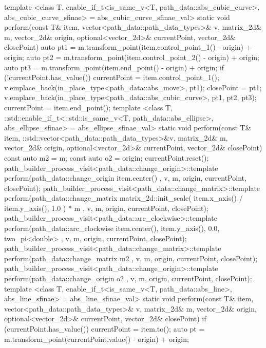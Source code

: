 \begin{codeblock}
{{      template <class T, enable_if_t<is_same_v<T, path_data::abs_cubic_curve>, abs_cubic_curve_sfinae> = abs_cubic_curve_sfinae_val>
      static void perform(const T& item, vector<path_data::path_data_types>& v, matrix_2d& m, vector_2d& origin, optional<vector_2d>& currentPoint, vector_2d& closePoint) {
        auto pt1 = m.transform_point(item.control_point_1() - origin) + origin;
        auto pt2 = m.transform_point(item.control_point_2() - origin) + origin;
        auto pt3 = m.transform_point(item.end_point() - origin) + origin;
        if (!currentPoint.has_value()) {
          currentPoint = item.control_point_1();
          v.emplace_back(in_place_type<path_data::abs_move>, pt1);
          closePoint = pt1;
        }
        v.emplace_back(in_place_type<path_data::abs_cubic_curve>, pt1,
          pt2, pt3);
        currentPoint = item.end_point();
      }
      template <class T, ::std::enable_if_t<::std::is_same_v<T, path_data::abs_ellipse>, abs_ellipse_sfinae> = abs_ellipse_sfinae_val>
      static void perform(const T& item, ::std::vector<path_data::path_data_types>&v, matrix_2d& m, vector_2d& origin, optional<vector_2d>& currentPoint, vector_2d& closePoint) {
        const auto m2 = m;
        const auto o2 = origin;
        currentPoint.reset();
        path_builder_process_visit<path_data::change_origin>::template perform(path_data::change_origin{ item.center() }, v, m, origin, currentPoint, closePoint);
        path_builder_process_visit<path_data::change_matrix>::template perform(path_data::change_matrix{ matrix_2d::init_scale({ item.x_axis() / item.y_axis(), 1.0 }) * m }, v, m, origin, currentPoint, closePoint);
        path_builder_process_visit<path_data::arc_clockwise>::template perform(path_data::arc_clockwise{ item.center(), item.y_axis(), 0.0, two_pi<double> }, v, m, origin, currentPoint, closePoint);
        path_builder_process_visit<path_data::change_matrix>::template perform(path_data::change_matrix{ m2 }, v, m, origin, currentPoint, closePoint);
        path_builder_process_visit<path_data::change_origin>::template perform(path_data::change_origin{ o2 }, v, m, origin, currentPoint, closePoint);
      }
      template <class T, enable_if_t<is_same_v<T, path_data::abs_line>, abs_line_sfinae> = abs_line_sfinae_val>
      static void perform(const T& item, vector<path_data::path_data_types>& v, matrix_2d& m, vector_2d& origin, optional<vector_2d>& currentPoint, vector_2d& closePoint) {
        if (currentPoint.has_value()) {
          currentPoint = item.to();
          auto pt = m.transform_point(currentPoint.value() - origin) + origin;
}}}}
\end{codeblock}

